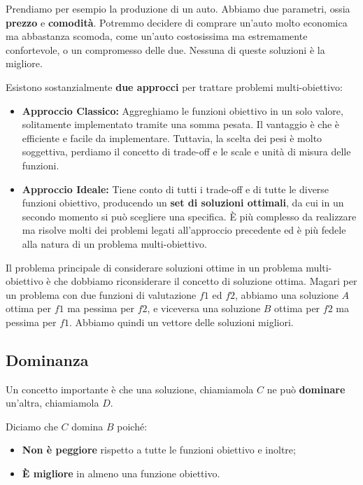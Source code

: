     Prendiamo per esempio la produzione di un auto. Abbiamo due parametri, ossia \textbf{prezzo} e \textbf{comodità}. Potremmo decidere di comprare un'auto molto economica ma abbastanza scomoda, come un'auto costosissima ma estremamente confortevole, o un compromesso delle due. Nessuna di queste soluzioni è la migliore.
    
    Esistono sostanzialmente \textbf{due approcci} per trattare problemi multi-obiettivo:
    \begin{itemize}
        \item \textbf{Approccio Classico:} Aggreghiamo le funzioni obiettivo in un solo valore, solitamente implementato tramite una somma pesata. Il vantaggio è che è efficiente e facile da implementare. Tuttavia, la scelta dei pesi è molto soggettiva, perdiamo il concetto di trade-off e le scale e unità di misura delle funzioni.
        
        \item \textbf{Approccio Ideale:} Tiene conto di tutti i trade-off e di tutte le diverse funzioni obiettivo, producendo un \textbf{set di soluzioni ottimali}, da cui in un secondo momento si può scegliere una specifica. È più complesso da realizzare ma risolve molti dei problemi legati all'approccio precedente ed è più fedele alla natura di un problema multi-obiettivo.
    \end{itemize}
    
    Il problema principale di considerare soluzioni ottime in un problema multi-obiettivo è che dobbiamo riconsiderare il concetto di soluzione ottima. Magari per un problema con due funzioni di valutazione $f1$ ed $f2$, abbiamo una soluzione $A$ ottima per $f1$ ma pessima per $f2$, e viceversa una soluzione $B$ ottima per $f2$ ma pessima per $f1$. Abbiamo quindi un vettore delle soluzioni migliori.
    
    \subsection{Dominanza}
        Un concetto importante è che una soluzione, chiamiamola $C$ ne può \textbf{dominare} un'altra, chiamiamola $D$.
        
        Diciamo che $C$ domina $B$ poiché:
        \begin{itemize}
            \item \textbf{Non è peggiore} rispetto a tutte le funzioni obiettivo e inoltre;
            \item \textbf{È migliore} in almeno una funzione obiettivo.
        \end{itemize}
        
